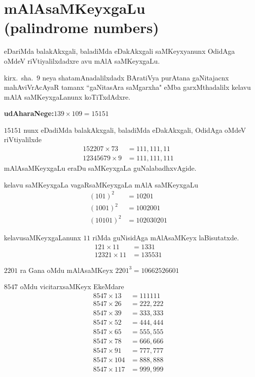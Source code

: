 \chapter[mAlAsaMKeyxgaLu ({\rm\bfseries palindrome numbers})]{mAlAsaMKeyxgaLu\\({\rm\bfseries palindrome numbers})}
\vskip -20pt

eDariMda balakAkxgali, baladiMda eDakAkxgali saMKeyxyanunx OdidAga oMdeV riVti\-yalilxdadxre avu mAlA saMKeyxgaLu.

kirx.~sha.\ $9$ neya shatamAnadalilxdadx BAratiVya purAtana gaNitajacnx \-mahAviVrAcAyaR tamanx ``gaNitasAra saMgarxha" eMba garxMthadalilx kelavu mAlA saMKeyxgaLanunx koTiTxdAdxre.

\textbf{udAharaNege:}\qquad $139 \times 109 = 15151$

$15151$ nunx eDadiMda balakAkxgali, baladiMda eDakAkxgali, OdidAga oMdeV riVtiyalilxde
\begin{align*}
152207 \times 73 &= 111,111,11\\
12345679 \times 9 &= 111,111,111
\end{align*}
mAlAsaMKeyxgaLu eraDu saMKeyxgaLa guNalabadhxvAgide.

kelavu saMKeyxgaLa vagaRsaMKeyxgaLa mAlA saMKeyxgaLu
\begin{align*}
(101)^2 &= 10201\\
(1001)^2 &= 1002001\\
(10101)^2 &= 102030201
\end{align*}

kelavusaMKeyxgaLanunx $11$ riMda guNisidAga mAlAsaMKeyx laBisutatxde.
\begin{align*}
121 \times 11 &=1331 \\
12321 \times 11 &= 135531
\end{align*}

$2201$ ra Gana oMdu mAlAsaMKeyx $2201^3 =10662526601$

$8547$ oMdu vicitarxsaMKeyx EkeMdare
\begin{align*}
8547 \times 13 &= 111111\\
8547 \times 26  &= 222,222 \\
8547 \times 39  &= 333,333 \\
8547 \times 52  &= 444,444 \\
8547 \times 65  &= 555,555 \\
8547 \times 78  &= 666,666 \\
8547 \times 91  &= 777,777 \\
8547 \times 104 &= 888,888 \\
8547 \times 117 &= 999,999 
\end{align*}

